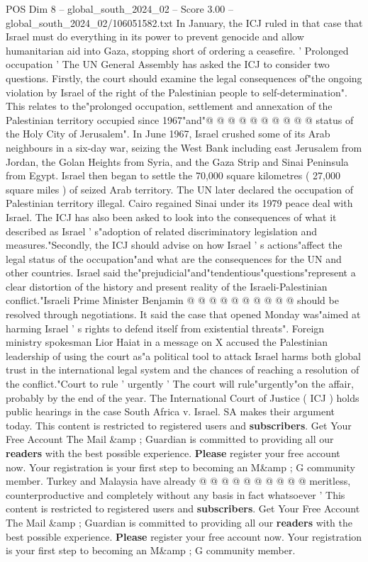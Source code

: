 \begin{textsample}{POS Dim 8 – global\_south\_2024\_02 – Score 3.00 – global\_south\_2024\_02/106051582.txt}
In January, the ICJ ruled in that case that Israel must do everything in its power to prevent genocide and allow humanitarian aid into Gaza, stopping short of ordering a ceasefire. ' Prolonged occupation ' The UN General Assembly has asked the ICJ to consider two questions.
Firstly, the court should examine the legal consequences of"the ongoing violation by Israel of the right of the Palestinian people to self-determination".
This relates to the"prolonged occupation, settlement and annexation of the Palestinian territory occupied since 1967"and"@ @ @ @ @ @ @ @ @ @ status of the Holy City of Jerusalem".
In June 1967, Israel crushed some of its Arab neighbours in a six-day war, seizing the West Bank including east Jerusalem from Jordan, the Golan Heights from Syria, and the Gaza Strip and Sinai Peninsula from Egypt.
Israel then began to settle the 70,000 square kilometres ( 27,000 square miles ) of seized Arab territory.
The UN later declared the occupation of Palestinian territory illegal.
Cairo regained Sinai under its 1979 peace deal with Israel.
The ICJ has also been asked to look into the consequences of what it described as Israel ' s"adoption of related discriminatory legislation and measures."Secondly, the ICJ should advise on how Israel ' s actions"affect the legal status of the occupation"and what are the consequences for the UN and other countries.
Israel said the"prejudicial"and"tendentious"questions"represent a clear distortion of the history and present reality of the Israeli-Palestinian conflict."Israeli Prime Minister Benjamin @ @ @ @ @ @ @ @ @ @ should be resolved through negotiations.
It said the case that opened Monday was"aimed at harming Israel ' s rights to defend itself from existential threats".
Foreign ministry spokesman Lior Haiat in a message on X accused the Palestinian leadership of using the court as"a political tool to attack Israel harms both global trust in the international legal system and the chances of reaching a resolution of the conflict."Court to rule ' urgently ' The court will rule"urgently"on the affair, probably by the end of the year.
The International Court of Justice ( ICJ ) holds public hearings in the case South Africa v.
Israel.
SA makes their argument today.
This content is restricted to registered users and \textbf{subscribers}.
Get Your Free Account The Mail \&amp ; Guardian is committed to providing all our \textbf{readers} with the best possible experience. \textbf{Please} register your free account now.
Your registration is your first step to becoming an M\&amp ; G community member.
Turkey and Malaysia have already @ @ @ @ @ @ @ @ @ @ meritless, counterproductive and completely without any basis in fact whatsoever ' This content is restricted to registered users and \textbf{subscribers}.
Get Your Free Account The Mail \&amp ; Guardian is committed to providing all our \textbf{readers} with the best possible experience. \textbf{Please} register your free account now.
Your registration is your first step to becoming an M\&amp ; G community member.

\end{textsample}
